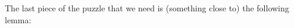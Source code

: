 \documentclass{patmorin}
\begin{document}
%
%
%


The last piece of the puzzle that we need is (something close to) the following lemma:
\end{document}
